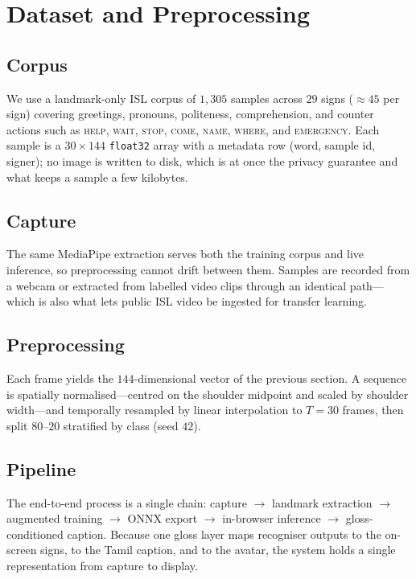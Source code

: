 \documentclass[conference]{IEEEtran}
\begin{document}
\section{Dataset and Preprocessing}\label{sec:data}
\subsection{Corpus}
We use a landmark-only ISL corpus of $1{,}305$ samples across $29$ signs
($\approx$$45$ per sign) covering greetings, pronouns, politeness,
comprehension, and counter actions such as \textsc{help}, \textsc{wait},
\textsc{stop}, \textsc{come}, \textsc{name}, \textsc{where}, and
\textsc{emergency}. Each sample is a $30\times144$ \texttt{float32} array with a
metadata row (word, sample id, signer); no image is written to disk, which is at
once the privacy guarantee and what keeps a sample a few kilobytes.

\subsection{Capture}
The same MediaPipe extraction serves both the training corpus and live
inference, so preprocessing cannot drift between them. Samples are recorded from
a webcam or extracted from labelled video clips through an identical path---which
is also what lets public ISL video be ingested for transfer learning.

\subsection{Preprocessing}
Each frame yields the $144$-dimensional vector of the previous section. A
sequence is spatially normalised---centred on the shoulder midpoint and scaled
by shoulder width---and temporally resampled by linear interpolation to $T=30$
frames, then split $80$--$20$ stratified by class (seed $42$).

\subsection{Pipeline}
The end-to-end process is a single chain: capture $\rightarrow$ landmark
extraction $\rightarrow$ augmented training $\rightarrow$ ONNX export
$\rightarrow$ in-browser inference $\rightarrow$ gloss-conditioned caption.
Because one gloss layer maps recogniser outputs to the on-screen signs, to the
Tamil caption, and to the avatar, the system holds a single representation from
capture to display.
\end{document}
